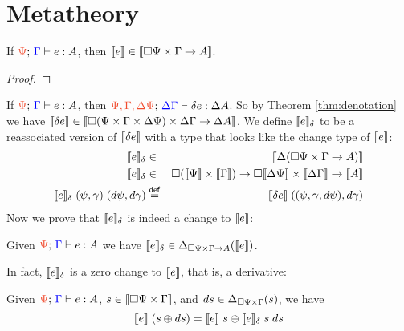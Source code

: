 \documentclass{article}
\begin{document}

\section{Metatheory}

\begin{theorem}[Denotation]
  \label{thm:denotation}
  If $\J{\GP}{\GG}{e}{A}$, then $\llbracket{e}\rrbracket \in {\llbracket{\square{\Psi} \times\Gamma\to A}\rrbracket}$.
\end{theorem}
\begin{proof}
\end{proof}

\newcommand{\dendelta}[1]{\den{#1}_\delta}

If $\J{\GP}{\GG}{e}{A}$, then $\J{\GP, \GG, \Ch\GP}{\Ch\GG}{\delta e}{\Ch A}$.
%
So by Theorem \ref{thm:denotation} we have
$\llbracket{\delta e}\rrbracket \in {\llbracket{\square{(\Psi\times\Gamma\times\Delta\Psi)} \times\Delta\Gamma\to \Delta A}\rrbracket}$.
%
We define $\dendelta{e}$ to be a reassociated version of
$\llbracket{\delta e}\rrbracket$ with a type that looks like the change type of $\llbracket{e}\rrbracket$:
%
\begin{eqnarray*}
  \dendelta{e} &\in& \Den{\Ch (\Disc{\GP} \x \GG \to A) }\\
  \dendelta{e} &\in& \Disc{(\Den{\GP} \x \Den{\GG})}
    \to \Disc{\Den{\Ch\GP}} \x \Den{\Ch\GG}  \to \Den{A}\\
  \dendelta{e} \; (\psi, \gamma) \; (d\psi, d\gamma)
  &\defeq& \den{\delta e} \; ((\psi, \gamma, d\psi), d\gamma)
\end{eqnarray*}
%
Now we prove that $\dendelta{e}$ is indeed a change to $\llbracket{e}\rrbracket$:

\begin{theorem}[Legitimacy]
  Given $\J{\GP}{\GG}{e}{A}$ we have
  $\dendelta{e} \in \Change{\Disc{\Psi} \x \GG \to A}{\den{e}}$.
\end{theorem}

In fact, $\dendelta{e}$ is a zero change to $\llbracket{e}\rrbracket$, that is, a derivative:

\begin{theorem}[Correctness]
  Given $\J{\GP}{\GG}{e}{A}$, $s \in {\llbracket{\square{\Psi} \times\Gamma}\rrbracket}$,
  and $ds \in \Delta_{\square{\Psi} \times \Gamma}({s})$, we have
  \begin{equation*}
    \den{e}\; (s \oplus ds)
    =
    \den{e}\; s \oplus \dendelta{e} \; s \; ds
  \end{equation*}


\end{theorem}
\end{document}
